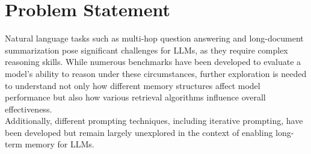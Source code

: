 \section{Problem Statement}
\label{sec:problemStatement}

Natural language tasks such as multi-hop question answering and long-document summarization pose significant challenges for LLMs, as they require complex reasoning skills. While numerous benchmarks have been developed to evaluate a model's ability to reason under these circumstances, further exploration is needed to understand not only how different memory structures affect model performance but also how various retrieval algorithms influence overall effectiveness. \\

\noindent Additionally, different prompting techniques, including iterative prompting, have been developed but remain largely unexplored in the context of enabling long-term memory for LLMs.